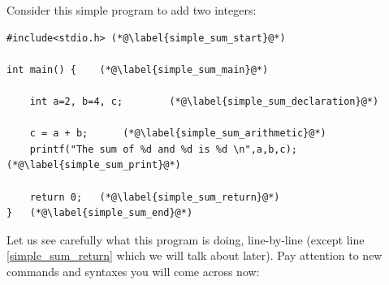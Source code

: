 \documentclass[11pt,oneside]{article}
\begin{document}
Consider this simple program to add two integers:

\begin{lstlisting}
#include<stdio.h> (*@\label{simple_sum_start}@*)

int main() {	(*@\label{simple_sum_main}@*)

	int a=2, b=4, c;		(*@\label{simple_sum_declaration}@*)
	
	c = a + b;		(*@\label{simple_sum_arithmetic}@*)
	printf("The sum of %d and %d is %d \n",a,b,c); (*@\label{simple_sum_print}@*)
	
	return 0;	(*@\label{simple_sum_return}@*)
}	(*@\label{simple_sum_end}@*)
\end{lstlisting}

Let us see carefully what this program is doing, line-by-line (except line \ref{simple_sum_return} which we will talk about later). Pay attention to new commands and syntaxes you will come across now:\\[1cm]
\end{document}
